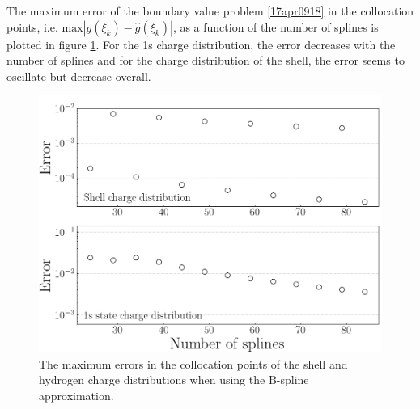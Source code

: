 \documentclass[twocolumn]{article}
\begin{document}
\begin{large}
The maximum error of the boundary value problem \eqref{17apr0918} in the collocation points, i.e. \mbox{$\text{max}|g(\xi_k)-\hat{g}(\xi_k)|$}, as a function of the number of splines is plotted in figure \ref{17apr0946}. For the 1s charge distribution, the error decreases with the number of splines and for the charge distribution of the shell, the error seems to oscillate but decrease overall.
\begin{figure}[h!]
    \includegraphics[scale=0.35]{Errors.png}
    \caption{The maximum errors in the collocation points of the shell and hydrogen charge distributions when using the B-spline approximation.}
    \label{17apr0946}
\end{figure}
















\end{large}
\end{document}
